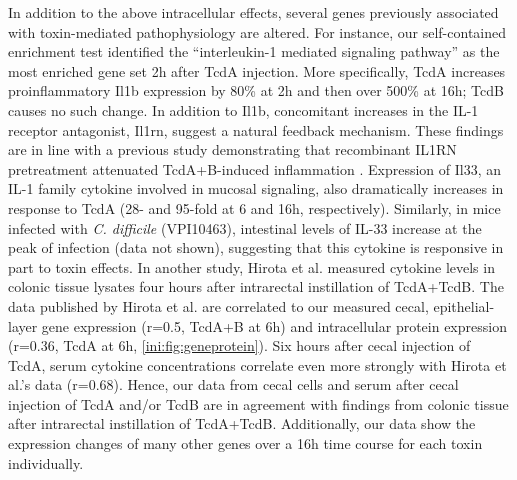 In addition to the above intracellular effects, several 
genes previously associated with toxin-mediated pathophysiology 
are altered. For instance, our self-contained enrichment test 
identified the ``interleukin-1 mediated signaling pathway'' as 
the most enriched gene set 2h after TcdA injection. More specifically, 
TcdA increases proinflammatory Il1b expression by 80\% at 2h 
and then over 500\% at 16h; TcdB causes no such change. In 
addition to Il1b, concomitant increases in the IL-1 receptor 
antagonist, Il1rn, suggest a natural feedback mechanism. These 
findings are in line with a previous study demonstrating that 
recombinant IL1RN pretreatment attenuated TcdA+B-induced 
inflammation \cite{Ng:2010hu}. Expression of Il33, an IL-1 family 
cytokine involved in mucosal signaling, also dramatically increases 
in response to TcdA (28- and 95-fold at 6 and 16h, respectively). 
Similarly, in mice infected with \textit{C. difficile} (VPI10463), 
intestinal levels of IL-33 increase at the peak of infection (data 
not shown), suggesting that this cytokine is responsive in part to 
toxin effects. In another study, Hirota et al. measured cytokine 
levels in colonic tissue lysates four hours after intrarectal 
instillation of TcdA+TcdB. The data published by Hirota et al. 
are correlated to our measured cecal, epithelial-layer gene 
expression (r=0.5, TcdA+B at 6h) and intracellular protein 
expression (r=0.36, TcdA at 6h, \autoref{ini:fig:geneprotein}). 
Six hours after cecal injection of TcdA, serum cytokine 
concentrations correlate even more strongly with Hirota et 
al.'s data (r=0.68). Hence, our data from cecal cells and 
serum after cecal injection of TcdA and/or TcdB are in 
agreement with findings from colonic tissue after intrarectal 
instillation of TcdA+TcdB. Additionally, our data show the 
expression changes of many other genes over a 16h time course 
for each toxin individually. 


